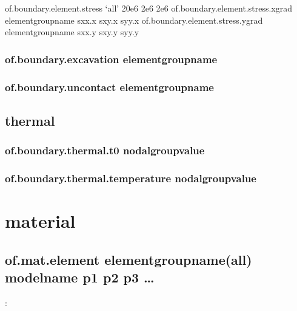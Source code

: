 \documentclass[letterpaper,10pt,english]{sphinxmanual}
\begin{document}
\begin{sphinxVerbatim}[commandchars=\\\{\}]
of.boundary.element.stress ‘all’ \PYGZhy{}20e6 2e6 \PYGZhy{}2e6
of.boundary.element.stress.xgrad elementgroupname sxx.x sxy.x syy.x
of.boundary.element.stress.ygrad elementgroupname sxx.y sxy.y syy.y
\end{sphinxVerbatim}


\subsection{of.boundary.excavation elementgroupname}
\label{\detokenize{rst_tutorials/command_line_guide:of-boundary-excavation-elementgroupname}}

\subsection{of.boundary.uncontact elementgroupname}
\label{\detokenize{rst_tutorials/command_line_guide:of-boundary-uncontact-elementgroupname}}

\section{thermal}
\label{\detokenize{rst_tutorials/command_line_guide:thermal}}

\subsection{of.boundary.thermal.t0 nodalgroupvalue}
\label{\detokenize{rst_tutorials/command_line_guide:of-boundary-thermal-t0-nodalgroupvalue}}

\subsection{of.boundary.thermal.temperature nodalgroupvalue}
\label{\detokenize{rst_tutorials/command_line_guide:of-boundary-thermal-temperature-nodalgroupvalue}}

\chapter{material}
\label{\detokenize{rst_tutorials/command_line_guide:material}}\label{\detokenize{rst_tutorials/command_line_guide:section-15}}

\section{of.mat.element elementgroupname(all) modelname p1 p2 p3 …}
\label{\detokenize{rst_tutorials/command_line_guide:of-mat-element-elementgroupname-all-modelname-p1-p2-p3}}
:
\end{document}
